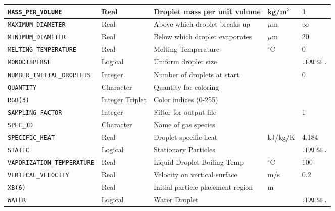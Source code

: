\documentclass[11pt]{book}
\newcommand{\ct}{\tt\small}
\begin{document}
\begin{table}[H]
\begin{tabular*}{\textwidth}{@{\extracolsep{\fill}}|l|l|l|l|l|}
{\ct MASS\_PER\_VOLUME}         & Real            & Droplet mass per unit volume      & kg/m$^3$  & 1             \\ \hline
{\ct MAXIMUM\_DIAMETER}         & Real            & Above which droplet breaks up     & $\mu$m    & $\infty$      \\ \hline
{\ct MINIMUM\_DIAMETER}         & Real            & Below which droplet evaporates    & $\mu$m    & 20            \\ \hline
{\ct MELTING\_TEMPERATURE}      & Real            & Melting Temperature               & $^\circ$C & 0             \\ \hline
{\ct MONODISPERSE}              & Logical         & Uniform droplet size              &           & {\ct .FALSE.} \\ \hline
{\ct NUMBER\_INITIAL\_DROPLETS} & Integer         & Number of droplets at start       &           & 0             \\ \hline
{\ct QUANTITY}                  & Character       & Quantity for coloring             &           &               \\ \hline
{\ct RGB(3)}                    & Integer Triplet & Color indices (0-255)             &           &               \\ \hline
{\ct SAMPLING\_FACTOR}          & Integer         & Filter for output file            &           & 1             \\ \hline
{\ct SPEC\_ID}                  & Character       & Name of gas species               &           &               \\ \hline
{\ct SPECIFIC\_HEAT}            & Real            & Droplet specific heat             & kJ/kg/K   & 4.184         \\ \hline
{\ct STATIC}                    & Logical         & Stationary Particles              &           & {\ct .FALSE.} \\ \hline
{\ct VAPORIZATION\_TEMPERATURE} & Real            & Liquid Droplet Boiling Temp       & $^\circ$C & 100           \\ \hline
{\ct VERTICAL\_VELOCITY}        & Real            & Velocity on vertical surface      & m/s       &  0.2          \\ \hline
{\ct XB(6)}                     & Real            & Initial particle placement region & m         &               \\ \hline
{\ct WATER}                     & Logical         & Water Droplet                     &           & {\ct .FALSE.} \\ \hline
\end{tabular*}
\end{table}
\end{document}
